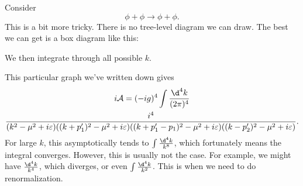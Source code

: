 \documentclass[a4paper]{article}
\begin{document}
\begin{eg}
  Consider
  \[
    \phi + \phi \to \phi + \phi.
  \]
  This is a bit more tricky. There is no tree-level diagram we can draw. The best we can get is a box diagram like this:
  \begin{center}
  \end{center}
  We then integrate through all possible $k$.

  This particular graph we've written down gives
  \begin{multline*}
    i\mathcal{A} = (-ig)^4 \int \frac{\d^4 k}{(2\pi)^4}\\\frac{i^4}{(k^2 - \mu^2 + i\varepsilon)((k + p_1')^2 - \mu^2 + i\varepsilon)((k + p_1' - p_1)^2 - \mu^2 + i \varepsilon)((k - p_2')^2 - \mu^2 + i \varepsilon)}.
  \end{multline*}
  For large $k$, this asymptotically tends to $\int \frac{\d^4 k}{k^8}$, which fortunately means the integral converges. However, this is usually not the case. For example, we might have $\frac{\d^4k}{k^4}$, which diverges, or even $\int \frac{\d^4 k}{k^2}$. This is when we need to do renormalization.
\end{eg}
\end{document}
